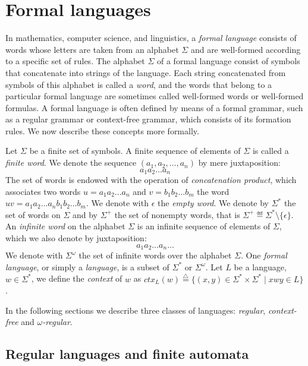 \section{Formal languages}
\label{sec:formal-langs}

In mathematics, computer science, and linguistics, a \emph{formal language} consists
of words whose letters are taken from an alphabet $\Sigma$ and are
well-formed according to a specific set of rules.
The alphabet $\Sigma$ of a formal language consist of symbols that
concatenate into strings of the language.
Each string concatenated from symbols of this alphabet is called a \emph{word},
and the words that belong to a particular formal language are sometimes
called well-formed words or well-formed formulas.
A formal language is often defined by means of a formal grammar, such as a
regular grammar or context-free grammar, which consists of its formation rules.
We now describe these concepts more formally.

Let $\Sigma$ be a finite set of symbols.
A finite sequence of elements of $\Sigma$ is called a \emph{finite word}.
We denote the sequence $(a_1, a_2, \dots, a_n)$ by mere juxtaposition:
\[a_1a_2\dots a_n\]
The set of words is endowed with the operation of \emph{concatenation product},
which associates two words $u = a_1 a_2 \dots a_n$ and $v = b_1 b_2 \dots b_m$
the word $uv = a_1 a_2 \dots a_n b_1 b_2 \dots b_m$.
We denote with $\epsilon$ the \emph{empty word}.
We denote by $\Sigma^*$ the set of words on $\Sigma$ and by $\Sigma^+$ the set of
nonempty words, that is $\Sigma^+ \eqdef \Sigma^* \setminus \{\epsilon\}$.
An \emph{infinite word} on the alphabet $\Sigma$ is an infinite sequence of elements
of $\Sigma$, which we also denote by juxtaposition:
\[a_1 a_2 \dots a_n \dots \]
We denote with $\Sigma^{\omega}$ the set of infinite words over the alphabet
$\Sigma$.
One \emph{formal language}, or simply a \emph{language}, is a subset of
$\Sigma^*$ or $\Sigma^{\omega}$.
Let $L$ be a language, $w \in \Sigma^*$, we define
the \emph{context} of $w$ as
$ctx_{L}(w) \overset{\triangle}{=} \{(x,y) \in \Sigma^* \times \Sigma^* \; | \; xwy \in L\}$.


In the following sections we describe three classes of languages:
\emph{regular}, \emph{context-free} and
\emph{$\omega$-regular}.

\subsection{Regular languages and finite automata}

